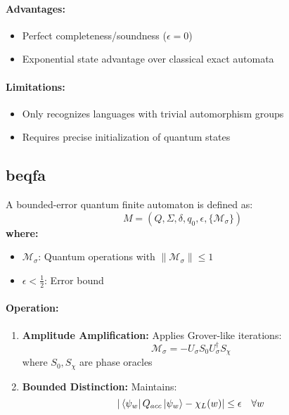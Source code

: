 \paragraph{Advantages:}
\begin{itemize}
    \item Perfect completeness/soundness ($\epsilon = 0$)
    \item Exponential state advantage over classical exact automata
\end{itemize}

\paragraph{Limitations:}
\begin{itemize}
    \item Only recognizes languages with trivial automorphism groups
    \item Requires precise initialization of quantum states
\end{itemize}

\subsection{\acrfull{beqfa}}
\label{subsec:beqfa}

\begin{definition}
A bounded-error quantum finite automaton is defined as:
\[
M = (Q, \Sigma, \delta, q_0, \epsilon, \{\mathcal{M}_\sigma\})
\]
\textbf{where:}
\begin{itemize}
    \item $\mathcal{M}_\sigma$: Quantum operations with $\|\mathcal{M}_\sigma\| \leq 1$
    \item $\epsilon < \frac{1}{2}$: Error bound
\end{itemize}
\end{definition}

\paragraph{Operation:}
\begin{enumerate}
    \item \textbf{Amplitude Amplification:} Applies Grover-like iterations:
    \[
    \mathcal{M}_\sigma = -U_\sigma S_0 U_\sigma^\dagger S_\chi
    \]
    where $S_0, S_\chi$ are phase oracles
    \item \textbf{Bounded Distinction:} Maintains:
    \[
    |\bra{\psi_w}Q_{acc}\ket{\psi_w} - \chi_L(w)| \leq \epsilon \quad \forall w
    \]
\end{enumerate}

